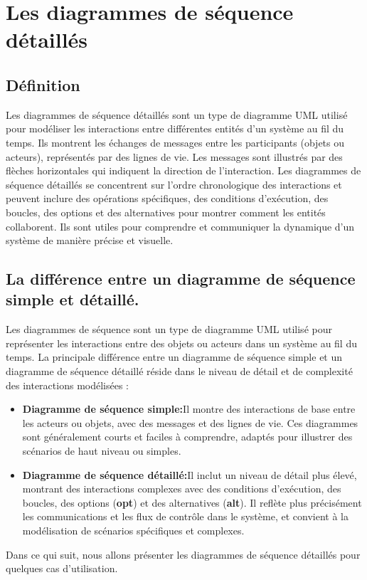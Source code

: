 \documentclass[edit,12pt,a4paper,ChapStyle,oneside,doubleinterligne]{report}
\begin{document}
\section{Les diagrammes de séquence détaillés}
\subsection{Définition}

Les diagrammes de séquence détaillés sont un type de diagramme UML utilisé pour modéliser les interactions entre différentes entités d'un système au fil du temps. Ils montrent les échanges de messages entre les participants (objets ou acteurs), représentés par des lignes de vie. Les messages sont illustrés par des flèches horizontales qui indiquent la direction de l'interaction.
\newline
\phantom{h}
\newline
Les diagrammes de séquence détaillés se concentrent sur l'ordre chronologique des interactions et peuvent inclure des opérations spécifiques, des conditions d'exécution, des boucles, des options et des alternatives pour montrer comment les entités collaborent. Ils sont utiles pour comprendre et communiquer la dynamique d'un système de manière précise et visuelle.
\cite{séquenced}
\subsection{La différence entre un diagramme de séquence simple et détaillé.}

Les diagrammes de séquence sont un type de diagramme UML utilisé pour représenter les interactions entre des objets ou acteurs dans un système au fil du temps.
\newline
\phantom{h}
\newline
La principale différence entre un diagramme de séquence simple et un diagramme de séquence détaillé réside dans le niveau de détail et de complexité des interactions modélisées :
\begin{itemize}
    \item \textbf{Diagramme de séquence simple:}Il montre des interactions de base entre les acteurs ou objets, avec des messages et des lignes de vie. Ces diagrammes sont généralement courts et faciles à comprendre, adaptés pour illustrer des scénarios de haut niveau ou simples.
    \item \textbf{Diagramme de séquence détaillé:}Il inclut un niveau de détail plus élevé, montrant des interactions complexes avec des conditions d'exécution, des boucles, des options (\textbf{opt}) et des alternatives (\textbf{alt}). Il reflète plus précisément les communications et les flux de contrôle dans le système, et convient à la modélisation de scénarios spécifiques et complexes.
\end{itemize}
Dans ce qui suit, nous allons présenter les diagrammes de séquence détaillés pour quelques cas d'utilisation.
\end{document}

